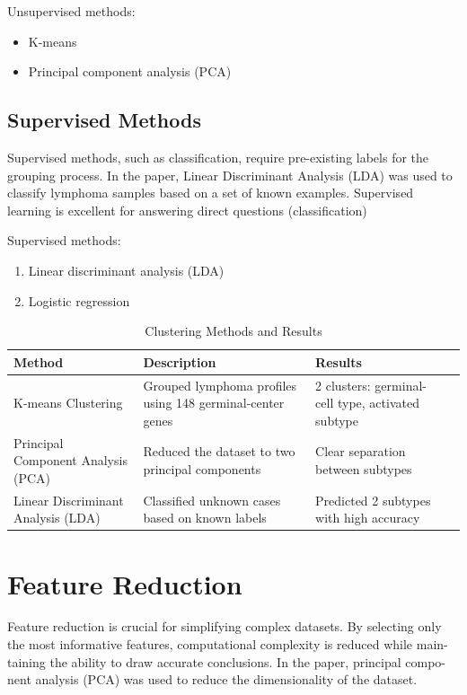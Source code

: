 \documentclass{llncs}
\begin{document}
Unsupervised methods:

\begin{itemize}
  \item K-means
  \item Principal component analysis (PCA)  
\end{itemize}

\subsection{Supervised Methods}

Supervised methods, such as classification, require pre-existing labels for
the grouping process. In the paper, Linear Discriminant Analysis (LDA) was
used to classify lymphoma samples based on a set of known examples.
Supervised learning is excellent for answering direct questions (classification)

Supervised methods:

\begin{enumerate}
  \item Linear discriminant analysis (LDA)
  \item Logistic regression
\end{enumerate}


\begin{table}
    \label{tab:example1}
 	\caption{Clustering Methods and Results}
	\centering
	\begin{tabular}{C|CCC}
 		\toprule
 		Method & Description & Results \\
 		\midrule
 		K-means Clustering  & Grouped lymphoma profiles using 148 germinal-center genes & 2 clusters: germinal-cell type, activated subtype \\
   		Principal Component Analysis (PCA) & Reduced the dataset to two principal components & Clear separation between subtypes \\
		Linear Discriminant Analysis (LDA) & Classified unknown cases based on known labels & Predicted 2 subtypes with high accuracy \\
 		\bottomrule
 	\end{tabular}
\end{table}

\section{Feature Reduction}

Feature reduction is crucial for simplifying complex datasets. By selecting only
the most informative features, computational complexity is reduced while main-
taining the ability to draw accurate conclusions. In the paper, principal compo-
nent analysis (PCA) was used to reduce the dimensionality of the dataset.
\end{document}
